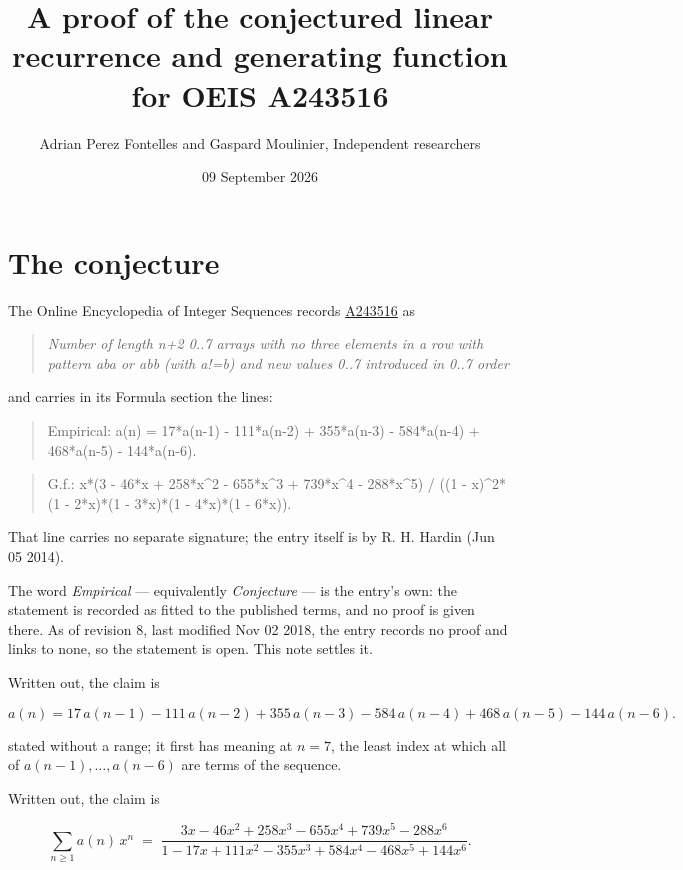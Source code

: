 \documentclass[11pt]{article}
\title{A proof of the conjectured linear recurrence and generating function for OEIS A243516}
\author{Adrian Perez Fontelles and Gaspard Moulinier, Independent researchers}
\date{09 September 2026}
\theoremstyle{definition}
\begin{document}
\maketitle
\section{The conjecture}

The Online Encyclopedia of Integer Sequences records \href{https://oeis.org/A243516}{A243516} as

\begin{quote}\itshape Number of length n+2 0..7 arrays with no three elements in a row with pattern aba or abb (with a!=b) and new values 0..7 introduced in 0..7 order\end{quote}

and carries in its Formula section the lines:

\begin{quote}\ttfamily Empirical: a(n) = 17*a(n-1) - 111*a(n-2) + 355*a(n-3) - 584*a(n-4) + 468*a(n-5) - 144*a(n-6).\end{quote}

\begin{quote}\ttfamily G.f.: x*(3 - 46*x + 258*x\textasciicircum{}2 - 655*x\textasciicircum{}3 + 739*x\textasciicircum{}4 - 288*x\textasciicircum{}5) / ((1 - x)\textasciicircum{}2*(1 - 2*x)*(1 - 3*x)*(1 - 4*x)*(1 - 6*x)).\end{quote}

That line carries no separate signature; the entry itself is by R. H. Hardin (Jun 05 2014).

The word {\itshape Empirical} --- equivalently {\itshape Conjecture} --- is the entry's own: the statement is recorded as fitted to the published terms, and no proof is given there. As of revision 8, last modified Nov 02 2018, the entry records no proof and links to none, so the statement is open. This note settles it.

Written out, the claim is

\[a(n) = 17\,a(n-1) - 111\,a(n-2) + 355\,a(n-3) - 584\,a(n-4) + 468\,a(n-5) - 144\,a(n-6).\]

stated without a range; it first has meaning at $n = 7$, the least index at which all of $a(n-1),\dots,a(n-6)$ are terms of the sequence.

Written out, the claim is

\[\sum_{n \ge 1} a(n)\,x^n \;=\; \frac{3x - 46x^{2} + 258x^{3} - 655x^{4} + 739x^{5} - 288x^{6}}{1 - 17x + 111x^{2} - 355x^{3} + 584x^{4} - 468x^{5} + 144x^{6}}.\]
\end{document}
